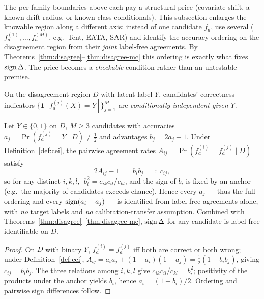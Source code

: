 
The per-family boundaries above each pay a structural price (covariate shift, a known
drift radius, or known class-conditionals). This subsection enlarges the knowable region
along a different axis: instead of one candidate $f_a$, use several
($f_a^{(1)},\dots,f_a^{(M)}$, e.g.\ Tent, EATA, SAR) and identify the accuracy ordering on
the disagreement region from their \emph{joint} label-free agreements. By
Theorems~\ref{thm:disagree}--\ref{thm:disagree-mc} this ordering is exactly what fixes
$\operatorname{sign}\Delta$. The price becomes a \emph{checkable} condition rather than an untestable
premise.

\begin{definition}\label{def:cei}
On the disagreement region $D$ with latent label $Y$, candidates' correctness indicators
$\{\mathbf1[f_a^{(j)}(X){=}Y]\}_{j=1}^M$ are \emph{conditionally independent given $Y$}.
\end{definition}

\begin{theorem}\label{thm:multicand}
Let $Y\in\{0,1\}$ on $D$, $M\ge3$ candidates with accuracies $a_j=\Pr(f_a^{(j)}{=}Y\mid D)\neq\tfrac12$
and advantages $b_j=2a_j-1$. Under Definition~\ref{def:cei}, the pairwise agreement rates
$A_{ij}=\Pr(f_a^{(i)}{=}f_a^{(j)}\mid D)$ satisfy
\[
2A_{ij}-1 \;=\; b_i b_j \;=:\; c_{ij},
\]
so for any distinct $i,k,l$, $\;b_i^2=c_{ik}c_{il}/c_{kl}$, and the sign of $b_i$ is fixed
by an anchor (e.g.\ the majority of candidates exceeds chance). Hence every $a_j$ --- thus
the full ordering and every $\operatorname{sign}(a_i-a_j)$ --- is identified from label-free agreements
alone, with \emph{no} target labels and \emph{no} calibration-transfer assumption.
Combined with Theorems~\ref{thm:disagree}--\ref{thm:disagree-mc}, $\operatorname{sign}\Delta$ for any
candidate is label-free identifiable on $D$.
\end{theorem}
\begin{proof}
On $D$ with binary $Y$, $f_a^{(i)}{=}f_a^{(j)}$ iff both are correct or both wrong; under
Definition~\ref{def:cei},
$A_{ij}=a_ia_j+(1-a_i)(1-a_j)=\tfrac12(1+b_ib_j)$, giving $c_{ij}=b_ib_j$. The three
relations among $i,k,l$ give $c_{ik}c_{il}/c_{kl}=b_i^2$; positivity of the products under
the anchor yields $b_i$, hence $a_i=(1+b_i)/2$. Ordering and pairwise sign differences
follow.
\end{proof}

